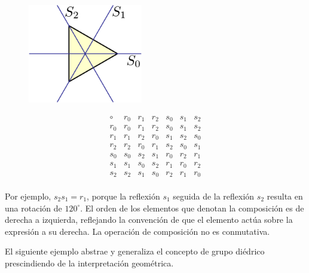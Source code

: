 \begin{figure}
    \includegraphics[width=5cm]{src/img/diedrico.png}
\end{figure}

\[
\begin{array}{c|cccccc}
\circ & r_0 & r_1 & r_2 & s_0 & s_1 & s_2 \\
\hline
r_0 & r_0 & r_1 & r_2 & s_0 & s_1 & s_2 \\
r_1 & r_1 & r_2 & r_0 & s_1 & s_2 & s_0 \\
r_2 & r_2 & r_0 & r_1 & s_2 & s_0 & s_1 \\
s_0 & s_0 & s_2 & s_1 & r_0 & r_2 & r_1 \\
s_1 & s_1 & s_0 & s_2 & r_1 & r_0 & r_2 \\
s_2 & s_2 & s_1 & s_0 & r_2 & r_1 & r_0 \\
\end{array}
\]

Por ejemplo, \(s_2 s_1 = r_1\), porque la reflexión \(s_1\) seguida de la reflexión \(s_2\) resulta en una rotación de \(120^\circ\). El orden de los elementos que denotan la composición es de derecha a izquierda, reflejando la convención de que el elemento actúa sobre la expresión a su derecha. La operación de composición no es conmutativa.

\clearpage

El siguiente ejemplo abstrae y generaliza el concepto de grupo diédrico prescindiendo de la interpretación geométrica.


